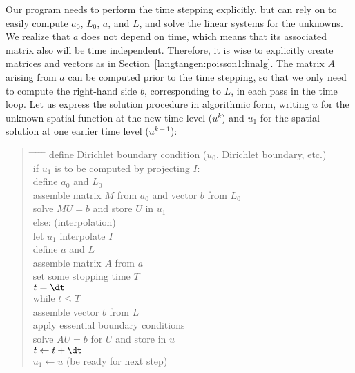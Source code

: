 Our program needs to perform the time stepping explicitly, but can
rely on \fenics{} to easily compute $a_0$, $L_0$, $a$, and $L$, and
solve the linear systems for the unknowns.  We realize that $a$ does
not depend on time, which means that its associated matrix also will be
time independent. Therefore, it is wise to explicitly create matrices and
vectors as in Section~\ref{langtangen:poisson1:linalg}.  The matrix $A$
arising from $a$ can be computed prior to the time stepping, so that
we only need to compute the right-hand side $b$, corresponding to $L$,
in each pass in the time loop. Let us express the solution procedure
in algorithmic form, writing $u$ for the unknown spatial function at
the new time level ($u^k$) and $u_1$ for the spatial solution at one
earlier time level ($u^{k-1}$):
\begin{quote}
\begin{tabbing}
\hspace*{0.5cm}\= \hspace{0.5cm} \= \hspace{0.5cm} \=
\hspace{0.5cm} \= \hspace{0.5cm} \= \kill
define Dirichlet boundary condition ($u_0$, Dirichlet boundary, etc.)\\
if $u_1$ is to be computed by projecting $I$:\\
\>define $a_0$ and $L_0$\\
\> assemble matrix $M$ from $a_0$ and vector $b$ from $L_0$\\
\> solve $MU=b$ and store $U$ in $u_1$\\
else:  (interpolation)\\
\> let $u_1$ interpolate $I$\\
define $a$ and $L$\\
assemble matrix $A$ from $a$\\
set some stopping time $T$\\
$t={\dt}$\\
while $t\leqslant T$\\
\> assemble vector $b$ from $L$\\
\> apply essential boundary conditions\\
\> solve $AU=b$ for $U$ and store in $u$\\
\> $t\leftarrow t + {\dt}$\\
\> $u_1 \leftarrow u$ (be ready for next step)
\end{tabbing}
\end{quote}

